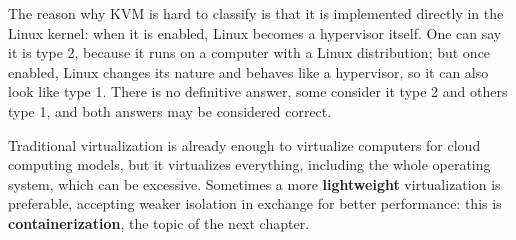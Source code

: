 The reason why KVM is hard to classify is that it is implemented directly in the Linux kernel: when it is enabled, Linux becomes a hypervisor itself. One can say it is type 2, because it runs on a computer with a Linux distribution; but once enabled, Linux changes its nature and behaves like a hypervisor, so it can also look like type 1. There is no definitive answer, some consider it type 2 and others type 1, and both answers may be considered correct.

\begin{center}
\end{center}

Traditional virtualization is already enough to virtualize computers for cloud computing models, but it virtualizes everything, including the whole operating system, which can be excessive. Sometimes a more \textbf{lightweight} virtualization is preferable, accepting weaker isolation in exchange for better performance: this is \textbf{containerization}, the topic of the next chapter.
